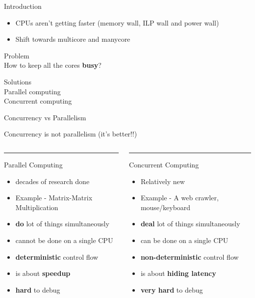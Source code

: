 \begin{frame}{Introduction}
\begin{itemize}
\item \small CPUs aren't getting faster (memory wall, ILP wall and power wall)
\item \small Shift towards multicore and manycore
\end{itemize}
\begin{center}
\Large {\color{red} Problem}\\
How to keep all the cores \textbf{busy}?
\end{center}
\pause
\begin{center}
\Large {\color{blue} Solutions}\\
Parallel computing \\ %
\pause
Concurrent computing %
\end{center}
\end{frame}

\begin{frame}{Concurrency vs Parallelism}
\begin{center}
\Large {\color{blue}Concurrency} is not {\color{red}parallelism} (it's better!!)
\end{center}
\pause
\begin{columns}
\begin{column}[t]{0.48\textwidth}
\color{red}\rule{\linewidth}{4pt}
Parallel Computing
\begin{itemize}
\item decades of research done
\item Example - Matrix-Matrix Multiplication
\item \textbf{do} lot of things simultaneously
\item cannot be done on a single CPU
\item \textbf{deterministic} control flow
\item is about \textbf{speedup}
\item \textbf{hard} to debug
\end{itemize}
\end{column}
\begin{column}[t]{0.48\textwidth}
\color{blue}\rule{\linewidth}{4pt}
Concurrent Computing
\begin{itemize}
\item Relatively new
\item Example - A web crawler, mouse/keyboard
\item \textbf{deal} lot of things simultaneously
\item can be done on a single CPU
\item \textbf{non-deterministic} control flow
\item is about \textbf{hiding latency}
\item \textbf{very hard} to debug
\end{itemize}
\end{column}
\end{columns}
\end{frame}